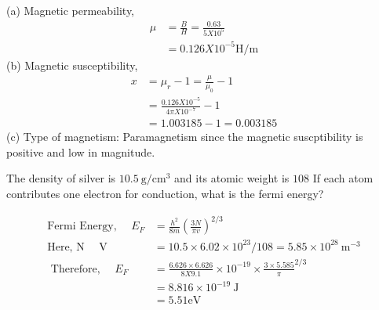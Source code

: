 \begin{enumerate}
\begin{answer}
		(a) Magnetic permeability, 
		\begin{align*}
		\mu&=\frac{B}{H}=\frac{0.63}{5 X 10^{5}}\\&=0.126 X 10^{-5} \mathrm{H} / \mathrm{m}
		\end{align*}
		(b) Magnetic susceptibility,
		\begin{align*}
		x&=\mu_{r}-1=\frac{\mu}{\mu_{0}}-1\\&=\frac{0.126 X 10^{-5}}{4 \pi X 10^{-7}}-1\\&=1.003185-1=0.003185
		\end{align*}
		(c) Type of magnetism: Paramagnetism since the magnetic suscptibility is positive and low in magnitude.
	\end{answer}
	\begin{minipage}{\textwidth}
		\item The density of silver is $10.5 \mathrm{~g} / \mathrm{cm}^{3}$  and its atomic weight is  $108$ If each atom contributes one electron for conduction, what is the fermi energy?
	\end{minipage}
	\begin{answer}
		\begin{align*}
		\text{Fermi Energy, }\quad
		E_{F}&=\frac{h^{2}}{8 m}\left(\frac{3 N}{\pi v}\right)^{2 / 3}\\
		\text{Here, N }\quad
		 \mathrm{V}&=10.5 \times 6.02 \times 10^{23} / 108
		=5.85 \times 10^{28} \mathrm{~m}^{-3}\\
	\text{	Therefore, }\quad
	E_{F}&=\frac{6.626 \times 6.626}{8 X 9.1} \times 10^{-19} \times \frac{3 \times 5.585}{\pi}^{2 / 3}\\
	&=8.816 \times 10^{-19} \mathrm{~J}\\
		&=5.51 \mathrm{eV}
		\end{align*}
	\end{answer}
\end{enumerate}